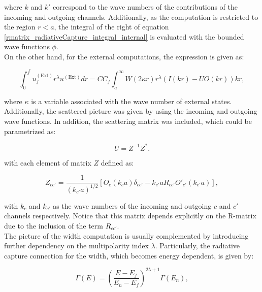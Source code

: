 \documentclass[openany]{book}
\begin{document}
where $k$ and $k'$ correspond to the wave numbers of the contributions of the incoming and outgoing channels. Additionally, as the computation is restricted to the region $r < a$, the integral of the right of equation \ref{rmatrix_radiativeCapture_integral_internal} is evaluated with the bounded wave functions $\phi$. \\

On the other hand, for the external computations, the expression is given as: 


\begin{equation}\label{rmatrix_radiativeCapture_integral_external}
	\int_0^{\int} u^{(\mathrm{Ext})}_f r^\lambda u^{(\mathrm{Ext})}  dr = C C_f \int_a^{\infty} W (2\kappa r) r^{\lambda} (I(kr) - U O(kr)) kr, 
\end{equation}

where $\kappa$ is a variable associated with the wave number of external states. Additionally, the scattered picture was given by using the incoming and outgoing wave functions. In addition, the scattering matrix was included, which could be parametrized as: 

\begin{equation}\label{rmatrix_collisionMatrix}
	U = Z^{-1} Z^{*}.
\end{equation}

with each element of matrix $Z$ defined as: 

\begin{equation}\label{rmatrix_collisionMatrix_Z}
	Z_{cc'} = \frac{1}{(k_{c'}a)^{1/2}} [O_c (k_c a)\delta_{cc'} - k_{c'}a R_{cc'} O'_{c'} (k_{c'}a) ],
\end{equation}

with $k_{c}$ and $k_{c'}$ as the wave numbers of the incoming and outgoing $c$ and $c'$ channels respectively. Notice that this matrix depends explicitly on the R-matrix due to the inclusion of the term $R_{cc'}$. \\

The picture of the width computation is usually complemented by introducing further dependency on the multipolarity index $\lambda$. Particularly, the radiative capture connection for the width, which becomes energy dependent, is given by:

 \begin{equation}\label{rmatrix_radiativeCapture_width_E}
	\Gamma(E) = \left( \frac{E - E_f}{E_n - E_f} \right)^{2\lambda + 1} \Gamma(E_n),
\end{equation}
\end{document}
